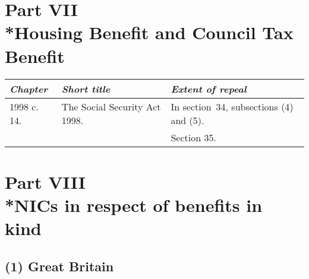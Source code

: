 \documentclass[12pt,a4paper]{article}
\begin{document}
\section[Part VII --- Housing Benefit and Council Tax Benefit]{Part VII\\*Housing Benefit and Council Tax Benefit}

\renewcommand\parthead{--- Schedule 9 Part VII}

{\footnotesize\centering
\begin{tabulary}{\linewidth}{JJJ}
\hline
\itshape Chapter	&\itshape Short title	&\itshape Extent of repeal\\
\hline
1998 c. 14. 	&The Social Security Act 1998. 	&In section~34, subsections (4)  and (5).\\
&&		Section 35.\\ 
\hline
\end{tabulary}

}



\section[Part VIII --- NICs in respect of benefits in kind]{Part VIII\\*NICs in respect of benefits in kind}

\renewcommand\parthead{--- Schedule 9 Part VIII}

\subsection*{(1) 
Great Britain}
\end{document}

